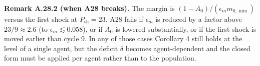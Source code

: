 \documentclass[11pt,a4paper]{article}
\begin{document}
\textbf{Remark A.28.2 (when A28 breaks).} The margin is \((1-A_0)/(\epsilon_m m_{0,\min})\)
versus the first shock at \(P_{\mathrm{sh}}=23\). A28 fails if \(\epsilon_m\) is
reduced by a factor above \(23/9\approx2.6\) (to \(\epsilon_m\lesssim0.058\)), or if
\(A_0\) is lowered substantially, or if the first shock is moved earlier than cycle
9. In any of those cases Corollary 4 still holds at the level of a single agent,
but the deficit \(\delta\) becomes agent-dependent and the closed form must be
applied per agent rather than to the population.

\vspace*{-0.9\baselineskip}


\end{document}
